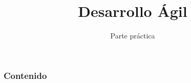 \documentclass{beamer}
\title{Desarrollo Ágil}  %
\subtitle[]{Parte práctica}
\begin{document}
\begin{frame}
  \titlepage
\end{frame}

\begin{frame}
  \frametitle{Contenido}
  \tableofcontents
\end{frame}



\end{document}
